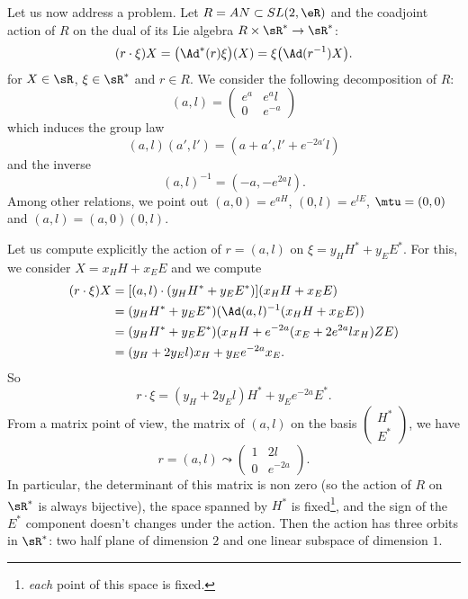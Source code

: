 Let us now address a problem. Let $R=AN\subset SL(2,\eR)$ and the coadjoint action of $R$ on the dual of its Lie algebra $R\times\sR^*\to\sR^*$:
\begin{equation}
(r\cdot \xi)X=\big( \Ad^*(r)\xi \big)(X)=\xi\big( \Ad(r^{-1})X \big).
\end{equation}
for $X\in\sR$, $\xi\in\sR^*$ and $r\in R$. We consider the following decomposition of $R$:
\begin{equation}  \label{eq:defeaeal}
(a,l)=
\begin{pmatrix}
e^a & e^al\\
0 & e^{-a}
\end{pmatrix}
\end{equation}
which induces the group law
\begin{equation}
  (a,l)(a',l')=(a+a',l'+e^{-2a'}l)
\end{equation}
and the inverse
\begin{equation}
  (a,l)^{-1}=(-a,-e^{2a}l).
\end{equation}
Among other relations, we point out $(a,0)=e^{aH}$, $(0,l)=e^{lE}$, $\mtu=(0,0)$ and $(a,l)=(a,0)(0,l)$.

Let us compute explicitly the action of $r=(a,l)$ on $\xi=y_H H^*+y_EE^*$. For this, we consider $X=x_H H+x_EE$ and we compute
\begin{equation}
\begin{split}
  (r\cdot \xi)X&=[(a,l)\cdot (y_HH^*+y_EE^*)](x_HH+x_EE)\\
		&=(y_HH^*+y_EE^*)(\Ad(a,l)^{-1} (x_HH+x_EE) )\\
		&=(y_HH^*+y_EE^*)(x_HH+e^{-2a}(x_E+2e^{2a}lx_H)ZE)\\
		&=(y_H+2y_El)x_H+y_E e^{-2a}x_E.
\end{split}
\end{equation}
So
\begin{equation}
  r\cdot \xi=(y_H+2y_El)H^*+y_Ee^{-2a}E^*.
\end{equation}
From a matrix point of view, the matrix of $(a,l)$ on the basis
$\begin{pmatrix}
H^*\\
E^*
\end{pmatrix}
$, we have
\[ 
  r=(a,l)\leadsto
\begin{pmatrix}
1&2l\\0&e^{-2a}
\end{pmatrix}.
\]
In particular, the determinant of this matrix is non zero (so the action of $R$ on $\sR^*$ is always bijective), the space spanned by $H^*$ is fixed\footnote{\emph{each} point of this space is fixed.}, and the sign of the $E^*$ component doesn't changes under the action. Then the action has three orbits in $\sR^*$: two half plane of dimension $2$ and one linear subspace of dimension $1$.


